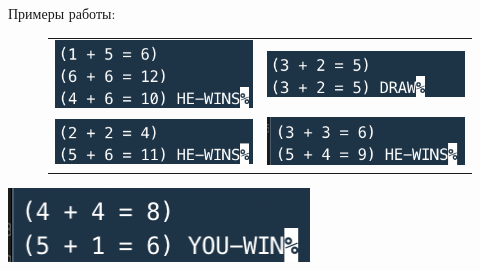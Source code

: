 \documentclass[a4paper,14pt]{extreport} %
\begin{document}
\begin{enumerate}
Примеры работы:

\begin{figure}[ht]\center
	\begin{tabular}{cc}
		\includegraphics[width=80mm]{1} & \includegraphics[width=80mm]{2} \\
		\includegraphics[width=80mm]{3} & \includegraphics[width=80mm]{4}
	\end{tabular}
\end{figure}

\includegraphics[width=80mm]{5}

\end{enumerate}
\end{document}
